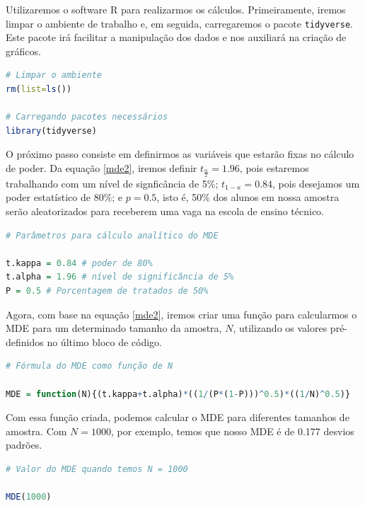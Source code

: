 Utilizaremos o software R para realizarmos os cálculos. Primeiramente, iremos limpar o ambiente de trabalho e, em seguida, carregaremos o pacote \texttt{tidyverse}. Este pacote irá facilitar a manipulação dos dados e nos auxiliará na criação de gráficos. 

\begin{boxH}
\begin{lstlisting}[language = R]
# Limpar o ambiente 
rm(list=ls())

# Carregando pacotes necessários
library(tidyverse)
\end{lstlisting}
\end{boxH}

O próximo passo consiste em definirmos as variáveis que estarão fixas no cálculo de poder. Da equação \eqref{mde2}, iremos definir $t_{\frac{\alpha}{2}} = 1.96$, pois estaremos trabalhando com um nível de signficância de 5\%; $t_{1-\kappa} = 0.84$, pois desejamos um poder estatístico de 80\%; e $p = 0.5$, isto é, 50\% dos alunos em nossa amostra serão aleatorizados para receberem uma vaga na escola de ensino técnico.

\begin{boxH}
\begin{lstlisting}[language = R]
# Parâmetros para cálculo analítico do MDE

t.kappa = 0.84 # poder de 80%
t.alpha = 1.96 # nível de significância de 5%
P = 0.5 # Porcentagem de tratados de 50%
\end{lstlisting}
\end{boxH}

Agora, com base na equação \eqref{mde2}, iremos criar uma função para calcularmos o MDE para um determinado tamanho da amostra, $N$, utilizando os valores pré-definidos no último bloco de código.  

\begin{boxH}
\begin{lstlisting}[language = R]
# Fórmula do MDE como função de N

MDE = function(N){(t.kappa+t.alpha)*((1/(P*(1-P)))^0.5)*((1/N)^0.5)}
\end{lstlisting}
\end{boxH}

Com essa função criada, podemos calcular o MDE para diferentes tamanhos de amostra. Com $N = 1000$, por exemplo, temos que nosso MDE é de 0.177 desvios padrões.

\begin{boxH}
\begin{lstlisting}[language = R]
# Valor do MDE quando temos N = 1000

MDE(1000)
\end{lstlisting}
\end{boxH}

